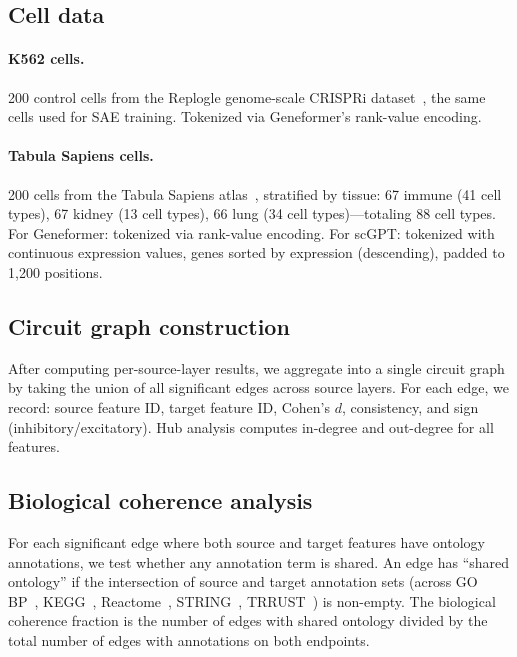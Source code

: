 \documentclass[onecolumn]{article}
\begin{document}
\subsection{Cell data}

\paragraph{K562 cells.} 200 control cells from the Replogle genome-scale CRISPRi dataset~\citep{replogle2022mapping}, the same cells used for SAE training. Tokenized via Geneformer's rank-value encoding.

\paragraph{Tabula Sapiens cells.} 200 cells from the Tabula Sapiens atlas~\citep{tabula2022tabula}, stratified by tissue: 67 immune (41 cell types), 67 kidney (13 cell types), 66 lung (34 cell types)---totaling 88 cell types. For Geneformer: tokenized via rank-value encoding. For scGPT: tokenized with continuous expression values, genes sorted by expression (descending), padded to 1,200 positions.

\subsection{Circuit graph construction}

After computing per-source-layer results, we aggregate into a single circuit graph by taking the union of all significant edges across source layers. For each edge, we record: source feature ID, target feature ID, Cohen's $d$, consistency, and sign (inhibitory/excitatory). Hub analysis computes in-degree and out-degree for all features.

\subsection{Biological coherence analysis}

For each significant edge where both source and target features have ontology annotations, we test whether any annotation term is shared. An edge has ``shared ontology'' if the intersection of source and target annotation sets (across GO BP~\citep{ashburner2000go}, KEGG~\citep{kanehisa2000kegg}, Reactome~\citep{jassal2020reactome}, STRING~\citep{szklarczyk2023string}, TRRUST~\citep{han2018trrust}) is non-empty. The biological coherence fraction is the number of edges with shared ontology divided by the total number of edges with annotations on both endpoints.
\end{document}
